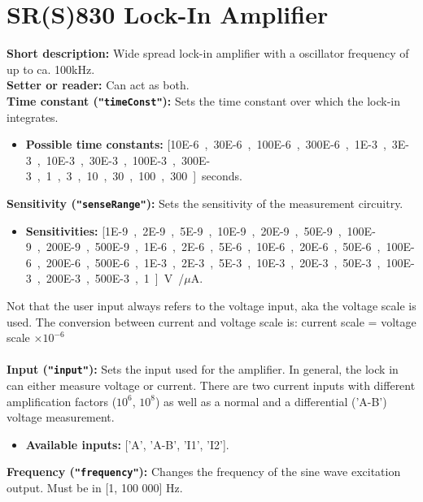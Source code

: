 \section{SR(S)830 Lock-In Amplifier}
\textbf{\textsf{Short description}:} Wide spread lock-in amplifier with a oscillator frequency of up to ca. 100kHz.\\
\textbf{\textsf{Setter or reader}:} Can act as both.\\
\textbf{\textsf{Time constant} (\texttt{"timeConst"}):} Sets the time constant over which the lock-in integrates.\\
\begin{itemize}[noitemsep]
\item \textbf{\textsf{Possible time constants:}} [\SI{10E-6}, \SI{30E-6}, \SI{100E-6},\SI{300E-6}, \SI{1E-3}, \SI{3E-3}, \SI{10E-3}, \SI{30E-3}, \SI{100E-3},\SI{300E-3},1, 3, 10, 30, 100, 300] seconds.
\end{itemize}
\textbf{\textsf{Sensitivity} (\texttt{"senseRange"}):} Sets the sensitivity of the measurement circuitry.\\
\begin{itemize}[noitemsep]
\item \textbf{\textsf{Sensitivities}:} [\SI{1E-9}, \SI{2E-9}, \SI{5E-9}, \SI{10E-9}, \SI{20E-9}, \SI{50E-9}, \SI{100E-9}, \SI{200E-9}, \SI{500E-9}, \SI{1E-6}, \SI{2E-6}, \SI{5E-6}, \SI{10E-6}, \SI{20E-6}, \SI{50E-6}, \SI{100E-6}, \SI{200E-6}, \SI{500E-6}, \SI{1E-3}, \SI{2E-3}, \SI{5E-3}, \SI{10E-3}, \SI{20E-3}, \SI{50E-3}, \SI{100E-3}, \SI{200E-3}, \SI{500E-3}, 1] V/$\mu$A.
\end{itemize}
Not that the user input always refers to the voltage input, aka the voltage scale is used. The conversion between current and voltage scale is: current scale = voltage scale $\times 10^{-6}$\\
\\
\textbf{\textsf{Input} (\texttt{"input"}):} Sets the input used for the amplifier. In general, the lock in can either measure voltage or current. There are two current inputs with different amplification factors ($10^6$, $10^8$) as well as a normal and a differential ('A-B') voltage measurement.\\
\begin{itemize}[noitemsep]
\item \textbf{\textsf{Available inputs:}} ['A', 'A-B', 'I1', 'I2'].
\end{itemize}
\textbf{\textsf{Frequency} (\texttt{"frequency"}):} Changes the frequency of the sine wave excitation output. Must be in [1, 100 000] Hz.\\
